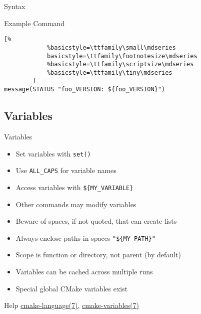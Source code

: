 \documentclass[t]{beamer}
\begin{document}
\begin{frame}[fragile]{Syntax}
    \begin{block}{Example Command}
        \begin{lstlisting}[%
            %basicstyle=\ttfamily\small\mdseries
            basicstyle=\ttfamily\footnotesize\mdseries
            %basicstyle=\ttfamily\scriptsize\mdseries
            %basicstyle=\ttfamily\tiny\mdseries
        ]
message(STATUS "foo_VERSION: ${foo_VERSION}")
        \end{lstlisting}
    \end{block}
\end{frame}

\subsection{Variables}

\begin{frame}{Variables}
    \begin{itemize}
        \item Set variables with \texttt{set()}
        \item Use \texttt{ALL\_CAPS} for variable names
        \item Access variables with \texttt{\$\{MY\_VARIABLE\}}
        \item Other commands may modify variables
        \item Beware of spaces, if not quoted, that can create lists
        \item Always enclose paths in spaces \texttt{"\$\{MY\_PATH\}"}
        \item Scope is function or directory, not parent (by default)
        \item Variables can be cached across multiple runs
        \item Special global CMake variables exist
    \end{itemize}

    \begin{block}{Help}
        \href{https://cmake.org/cmake/help/latest/manual/cmake-language.7.html}{cmake-language(7)},
        \href{https://cmake.org/cmake/help/latest/manual/cmake-variables.7.html}{cmake-variables(7)}
    \end{block}
\end{frame}
\end{document}
